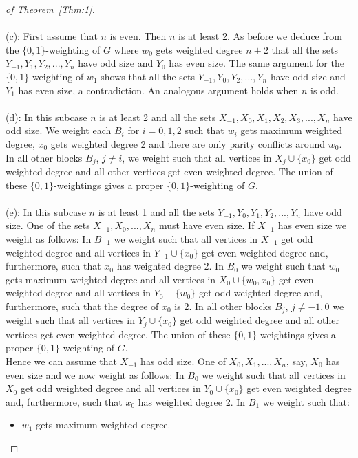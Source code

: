 \documentclass[
final,
 nomarks,
]{dmtcs-episciences}
\theoremstyle{definition}
\begin{document}
\begin{proof}[of Theorem~\ref{Thm:1}]
\\ \\
(c): First assume that $n$ is even. Then $n$ is at least 2. As before we deduce from the $\{0,1\}$-weighting of $G$ where $w_0$ gets weighted degree $n+2$ that all the sets $Y_{-1}, Y_1, Y_2,...,Y_n$ have odd size and $Y_0$ has even size. The same argument for the $\{0,1\}$-weighting of $w_1$ shows  that all the sets $Y_{-1}, Y_0, Y_2,...,Y_n$ have odd size and $Y_1$ has even size, a contradiction. An analogous argument holds when $n$ is odd.
\\ \\
(d): In this subcase $n$ is at least 2 and all the sets $X_{-1},X_0,X_1,X_2,X_3,...,X_n$ have odd size. We weight each $B_i $ for $i=0,1,2$ such that $w_i$ gets maximum weighted degree, $x_0$ gets weighted degree 2 and there are only parity conflicts around $w_0$. In all other blocks $B_j$, $j \neq i$, we weight such that all vertices in $X_j \cup \{x_0\}$ get odd weighted degree and all other vertices get even weighted degree. The union of these $\{0,1\}$-weightings gives a proper $\{0,1\}$-weighting of $G$. \\ \\
(e): In this subcase $n$ is at least 1 and all the sets $Y_{-1},Y_0,Y_1,Y_2,...,Y_n$ have odd size. One of the sets $X_{-1}, X_0,...,X_n$ must have even size. If $X_{-1}$ has even size we weight as follows: In $B_{-1}$ we weight such that all vertices in $X_{-1}$ get odd weighted degree and all vertices in $Y_{-1} \cup \{x_0\}$ get even weighted degree and, furthermore, such that $x_0$ has weighted degree 2. In $B_0$ we weight such that $w_0$ gets maximum weighted degree and all vertices in $X_0 \cup \{w_0, x_0\}$ get even weighted degree and all vertices in $Y_0 - \{w_0\}$ get odd weighted degree and, furthermore, such that the degree of $x_0$ is 2. In all other blocks $B_j$, $j \neq -1,0$ we weight such that all vertices in $Y_j \cup \{x_0\}$ get odd weighted degree and all other vertices get even weighted degree. The union of these $\{0,1\}$-weightings gives a proper $\{0,1\}$-weighting of $G$. \\
Hence we can assume that $X_{-1}$ has odd size. One of $X_0, X_1,..., X_n$, say, $X_0$ has even size and we now weight as follows: In $B_0$ we weight such that all vertices in $X_0$ get odd weighted degree and all vertices in $Y_0 \cup \{x_0\}$ get even weighted degree and, furthermore, such that $x_0$ has weighted degree 2. In $B_1$ we weight such that:
\begin{itemize}
\item $w_1$ gets maximum weighted degree.

\end{itemize}
\end{proof}
\end{document}
